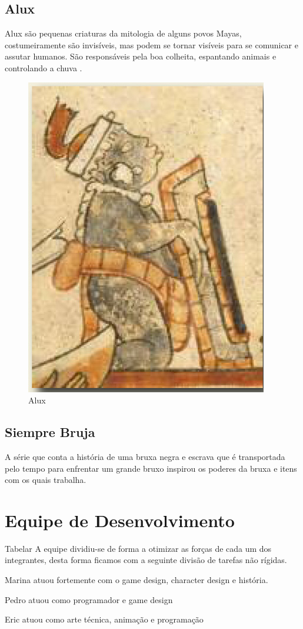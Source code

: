 \subsection{Alux}
Alux são pequenas criaturas da mitologia de alguns povos Mayas, costumeiramente são invisíveis, mas podem se tornar visíveis para se comunicar e assutar humanos.  São responsáveis pela boa colheita, espantando animais e controlando a chuva \cite{judith_2009}. 
\begin{figure}[htb]
	\caption{\label{fig_grafico}Alux}
	\begin{center}
	    \includegraphics[scale=0.5]{imagens/alux.jpg}
	\end{center}
\end{figure}
\vfill
\pagebreak

\subsection{Siempre Bruja}
A série que conta a história de uma bruxa negra e escrava que é transportada  pelo tempo para enfrentar um grande bruxo inspirou os poderes da bruxa e itens com os quais trabalha. 

\section{Equipe de Desenvolvimento}
Tabelar
A equipe dividiu-se de forma a otimizar as forças de cada um dos integrantes, desta forma ficamos com a seguinte divisão de tarefas não rígidas. 

Marina atuou fortemente com o game design, character design e história. 

Pedro atuou como programador e game design

Eric atuou como arte técnica, animação e programação